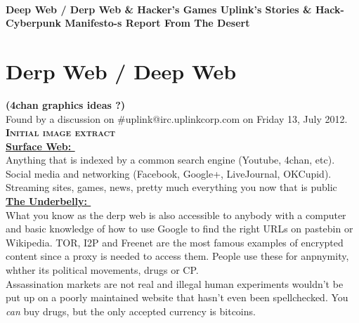 \documentclass[11pt,twoside,a4paper]{book}
\title{\txtTITLE}
\date{ --- }
\def\txtBIGTITLE{Deep Web / Derp Web \& Hacker's Games \newline \newline Uplink's Stories \& Hack-Cyberpunk Manifesto-s \newline \newline Report From The Desert } %
\begin{document}

\setlength\parindent{0pt} %

	\setlength{\itemsep}{1pt}
	\setlength{\parskip}{0pt}
	\setlength{\parsep}{0pt}

~\\
\vfill

\begin{center}
	\textbf{\huge \txtBIGTITLE} ~\\	
\end{center}

\vfill

\tableofcontents

\chapter{Derp Web / Deep Web} %

\textbf{\large (4chan graphics ideas ?) }~\\

Found by a discussion on \#uplink@irc.uplinkcorp.com on Friday 13, July 2012. ~\\

\textbf{\Large \textsc{Initial image extract}}~\\

\noindent
\textbf{\underline{Surface Web: }}~\\
Anything that is indexed by a common search engine (Youtube, 4chan, etc).~\\
Social media and networking (Facebook, Google+, LiveJournal, OKCupid).~\\
Streaming sites, games, news, pretty much everything you now that is public~\\

\noindent
\textbf{\underline{The Underbelly: }}~\\
What you know as the derp web is also accessible to anybody with a computer and basic knowledge of how to use Google to find the right URLs on pastebin or Wikipedia. TOR, I2P and Freenet are the most famous examples of encrypted content since a proxy is needed to access them. People use these for anpnymity, whther its political movements, drugs or CP.~\\

\noindent
Assassination markets are not real and illegal human experiments wouldn't be put up on a poorly maintained website that hasn't even been spellchecked. You \emph{can} buy drugs, but the only accepted currency is bitcoins.~\\
\end{document}
